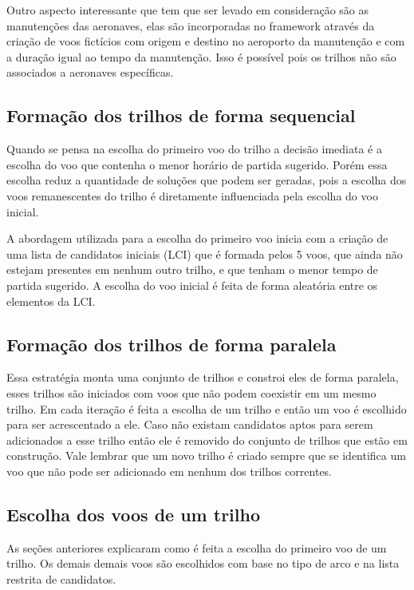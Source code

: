   Outro aspecto interessante que tem que ser levado em consideração são as manutenções das aeronaves, elas são incorporadas no framework através da criação de voos fictícios com origem e destino no aeroporto da manutenção e com a duração igual ao tempo da manutenção. Isso é possível pois os trilhos não são associados a aeronaves específicas.
  
\subsection{Formação dos trilhos de forma sequencial}

Quando se pensa na escolha do primeiro voo do trilho a decisão imediata é a escolha do voo que contenha o menor horário de partida sugerido. Porém essa escolha reduz a quantidade de soluções que podem ser geradas, pois a escolha dos voos remanescentes do trilho é diretamente influenciada pela escolha do voo inicial.

A abordagem utilizada para a escolha do primeiro voo inicia com a criação de uma lista de candidatos iniciais (LCI) que é formada pelos 5 voos, que ainda não estejam presentes em nenhum outro trilho, e que tenham o menor tempo de partida sugerido. A escolha do voo inicial é feita de forma aleatória entre os elementos da LCI.


\subsection{Formação dos trilhos de forma paralela}
  
  Essa estratégia monta uma conjunto de trilhos e constroi eles de forma paralela, esses trilhos são iniciados com voos que não podem coexistir em um mesmo trilho. Em cada iteração é feita a escolha de um trilho e então um voo é escolhido para ser acrescentado a ele. Caso não existam candidatos aptos para serem adicionados a esse trilho então ele é removido do conjunto de trilhos que estão em construção. 
  Vale lembrar que um novo trilho é criado sempre que se identifica um voo que não pode ser adicionado em nenhum dos trilhos correntes.
  
\subsection{Escolha dos voos de um trilho}

 As seções anteriores explicaram como é feita a escolha do primeiro voo de um trilho. Os demais demais voos são escolhidos com base no tipo de arco e na lista restrita de candidatos. 
 
